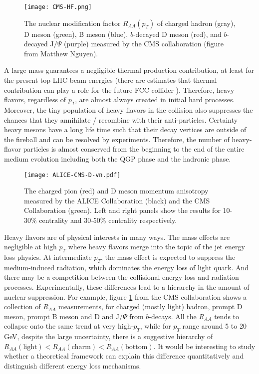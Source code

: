 \begin{figure}
\singlespacing 
\centering
\texttt{[image: CMS-HF.png]}
\caption[The nuclear modification factor $R_{AA}(p_T)$ of charged hadron (gray),]{The nuclear modification factor $R_{AA}(p_T)$ of charged hadron (gray), D meson (green), B meson (blue), $b$-decayed D meson (red), and $b$-decayed J$/\Psi$ (purple) measured by the CMS collaboration \cite{Khachatryan:2016odn,Sirunyan:2017isk,Sirunyan:2017xss,Sirunyan:2017oug} (figure from Matthew Nguyen).}
\label{fig:intro:Raa}
\end{figure}

A large mass guarantees a negligible thermal production contribution, at least for the present top LHC beam energies (there are estimates that thermal contribution can play a role for the future FCC collider \cite{Zhou:2016wbo}).
Therefore, heavy flavors, regardless of $p_T$, are almost always created in initial hard processes.
Moreover, the tiny population of heavy flavors in the collision also suppresses the chances that they annihilate / recombine with their anti-particles.
Certainty heavy mesons have a long life time such that their decay vertices are outside of the fireball and can be resolved by experiments.
Therefore, the number of heavy-flavor particles is almost conserved from the beginning to the end of the entire medium evolution including both the QGP phase and the hadronic phase.

\begin{figure}
\singlespacing 
\centering
\texttt{[image: ALICE-CMS-D-vn.pdf]}
\caption[The charged pion (red) and D meson momentum anisotropy]{The charged pion (red) and D meson momentum anisotropy measured by the ALICE Collaboration (black) and the CMS Collaboration (green). Left and right panels show the results for 10-30\% centrality and 30-50\% centrality respectively.}
\label{fig:intro:D-vn}
\end{figure}

Heavy flavors are of physical interests in many ways.
The mass effects are negligible at high $p_T$ where heavy flavors merge into the topic of the jet energy loss physics.
At intermediate $p_T$, the mass effect is expected to suppress the medium-induced radiation, which dominates the energy loss of light quark.
And there may be a competition between the collisional energy loss and radiation processes.
Experimentally, these differences lead to a hierarchy in the amount of nuclear suppression.
For example, figure \ref{fig:intro:Raa} from the CMS collaboration shows a collection of $R_{AA}$ measurements, for charged (mostly light) hadron, prompt D meson, prompt B meson and D and J/$\Psi$ from $b$-decays.
All the $R_{AA}$ tends to collapse onto the same trend at very high-$p_T$, while for $p_T$ range around 5 to 20 GeV, despite the large uncertainty, there is a suggestive hierarchy of $R_{AA}(\textrm{light}) < R_{AA}(\textrm{charm}) < R_{AA}(\textrm{bottom})$.
It would be interesting to study whether a theoretical framework can explain this difference quantitatively and distinguish different energy loss mechanisms.

